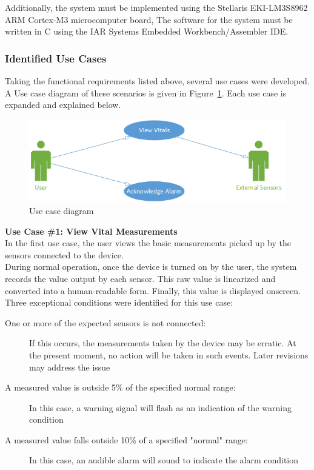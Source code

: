\documentclass[12pt]{article} %
\begin{document}
Additionally, the system must be implemented using the Stellaris 
EKI-LM3S8962 ARM Cortex-M3 microcomputer board, The software for the system 
must be written in C using the IAR Systems Embedded Workbench/Assembler IDE.



\subsubsection{Identified Use Cases}
Taking the functional requirements listed above, several use cases were
 developed. A Use case diagram of these scenarios is given in Figure~\ref{fig:useCases}. Each use case is expanded and explained below.

\begin{figure}[h]
	\centering
	\includegraphics[width=\textwidth]{../design/use_cases_graphical.png}
	\caption{Use case diagram}
	\label{fig:useCases}
\end{figure}

\textbf{Use Case \#1: View Vital Measurements } \\
In the first use case, the user views the basic measurements picked up by the
sensors connected to the device. \\
During normal operation, once the device is turned on by the user, the system
records the value output by each sensor. This raw value is linearized and 
converted into a human-readable form. Finally, this value is displayed onscreen. \\

Three exceptional conditions were identified for this use case: 
\begin{description}
\item [One or more of the expected sensors is not connected:] If this occurs, the measurements taken by the device may be erratic. At the present moment, no action will be taken in such events. Later revisions may address the issue
\item[A measured value is outside 5\% of the specified normal range:] In this case, a warning signal will flash as an indication of the warning condition
\item[A measured value falls outside 10\% of a specified "normal" range:] In this case, an audible alarm will sound to indicate the alarm condition
\end{description}
\end{document}
